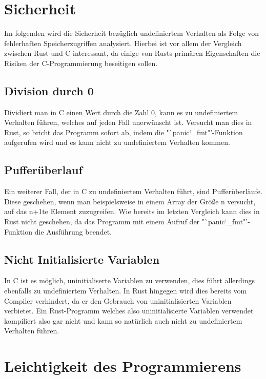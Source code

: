 \section{Sicherheit}

Im folgenden wird die Sicherheit bezüglich undefiniertem Verhalten als Folge von fehlerhaften Speicherzugriffen analysiert.
Hierbei ist vor allem der Vergleich zwischen Rust und C interessant, da einige von Rusts primären Eigenschaften die
Risiken der C-Programmierung beseitigen sollen.

\subsection{Division durch 0}

Dividiert man in C einen Wert durch die Zahl 0, kann es zu undefiniertem Verhalten führen, welches auf jeden Fall unerwünscht
ist. Versucht man dies in Rust, so bricht das Programm sofort ab, indem die "`panic\char`_fmt"'-Funktion aufgerufen wird und es
kann nicht zu undefiniertem Verhalten kommen.

\subsection{Pufferüberlauf}

Ein weiterer Fall, der in C zu undefiniertem Verhalten führt, sind Pufferüberläufe. Diese geschehen, wenn man beispielsweise
in einem Array der Größe n versucht, auf das n+1te Element zuzugreifen. Wie bereits im letzten Vergleich kann dies in 
Rust nicht geschehen, da das Programm mit einem Aufruf der "`panic\char`_fmt"'-Funktion die Ausführung beendet.

\subsection{Nicht Initialisierte Variablen}

In C ist es möglich, uninitialiserte Variablen zu verwenden, dies führt allerdings ebenfalls zu undefiniertem Verhalten.
In Rust hingegen wird dies bereits vom Compiler verhindert, da er den Gebrauch von uninitialisierten Variablen verbietet.
Ein Rust-Programm welches also uninitialisierte Variablen verwendet kompiliert also gar nicht und kann so natürlich auch nicht
zu undefiniertem Verhalten führen.

\section{Leichtigkeit des Programmierens}


